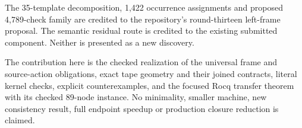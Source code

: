 The 35-template decomposition, 1,422 occurrence assignments and proposed 4,789-check family are credited to the repository's round-thirteen left-frame proposal. The semantic residual route is credited to the existing submitted component. Neither is presented as a new discovery.

The contribution here is the checked realization of the universal frame and source-action obligations, exact tape geometry and their joined contracts, literal kernel checks, explicit counterexamples, and the focused Rocq transfer theorem with its checked 89-node instance. No minimality, smaller machine, new consistency result, full endpoint speedup or production closure reduction is claimed.
